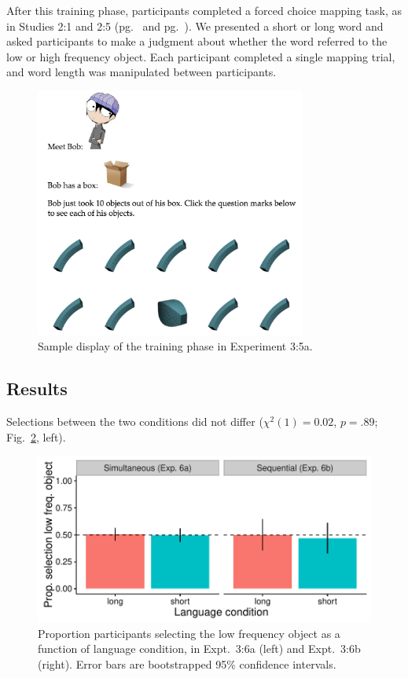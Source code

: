 After this training phase, participants completed a forced choice mapping task, as in Studies 2:1 and 2:5 (pg.\ \pageref{ch2-1} and pg.\ \pageref{ch2-5}). We presented a short or long word and asked participants to make a judgment about whether the word referred to the low or high frequency object. Each participant completed a single mapping trial, and word length was manipulated between participants.

 \begin{figure}[t!]
 \begin{center}
  \includegraphics[width=3.5in]{figs/seqfreq_display.png}
  \caption{\label{fig:seqfreq_display} Sample display of the training phase in Experiment 3:5a.}
 \end{center}
\end{figure}


 \subsection{Results}
 Selections between the two conditions did not differ (${\chi}^2$$(1) = 0.02$, $p = .89$; Fig.\ \ref{fig:freq_plots}, left).
 
  \begin{figure}[t!]
 \begin{center}
  \includegraphics[width=6in]{figs/freq_plots.pdf}
  \caption{\label{fig:freq_plots} Proportion participants selecting the low frequency object as a function of language condition, in Expt.\ 3:6a (left) and Expt.\ 3:6b (right). Error bars are bootstrapped 95\% confidence intervals.}
 \end{center}
\end{figure}

